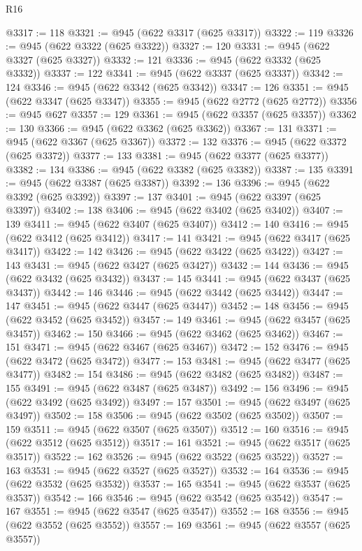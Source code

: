 \begin{lexlean}{R16}
\begin{coremodule}
@3317 := 118
@3321 := @945 (@622 @3317 (@625 @3317))
@3322 := 119
@3326 := @945 (@622 @3322 (@625 @3322))
@3327 := 120
@3331 := @945 (@622 @3327 (@625 @3327))
@3332 := 121
@3336 := @945 (@622 @3332 (@625 @3332))
@3337 := 122
@3341 := @945 (@622 @3337 (@625 @3337))
@3342 := 124
@3346 := @945 (@622 @3342 (@625 @3342))
@3347 := 126
@3351 := @945 (@622 @3347 (@625 @3347))
@3355 := @945 (@622 @2772 (@625 @2772))
@3356 := @945 @627
@3357 := 129
@3361 := @945 (@622 @3357 (@625 @3357))
@3362 := 130
@3366 := @945 (@622 @3362 (@625 @3362))
@3367 := 131
@3371 := @945 (@622 @3367 (@625 @3367))
@3372 := 132
@3376 := @945 (@622 @3372 (@625 @3372))
@3377 := 133
@3381 := @945 (@622 @3377 (@625 @3377))
@3382 := 134
@3386 := @945 (@622 @3382 (@625 @3382))
@3387 := 135
@3391 := @945 (@622 @3387 (@625 @3387))
@3392 := 136
@3396 := @945 (@622 @3392 (@625 @3392))
@3397 := 137
@3401 := @945 (@622 @3397 (@625 @3397))
@3402 := 138
@3406 := @945 (@622 @3402 (@625 @3402))
@3407 := 139
@3411 := @945 (@622 @3407 (@625 @3407))
@3412 := 140
@3416 := @945 (@622 @3412 (@625 @3412))
@3417 := 141
@3421 := @945 (@622 @3417 (@625 @3417))
@3422 := 142
@3426 := @945 (@622 @3422 (@625 @3422))
@3427 := 143
@3431 := @945 (@622 @3427 (@625 @3427))
@3432 := 144
@3436 := @945 (@622 @3432 (@625 @3432))
@3437 := 145
@3441 := @945 (@622 @3437 (@625 @3437))
@3442 := 146
@3446 := @945 (@622 @3442 (@625 @3442))
@3447 := 147
@3451 := @945 (@622 @3447 (@625 @3447))
@3452 := 148
@3456 := @945 (@622 @3452 (@625 @3452))
@3457 := 149
@3461 := @945 (@622 @3457 (@625 @3457))
@3462 := 150
@3466 := @945 (@622 @3462 (@625 @3462))
@3467 := 151
@3471 := @945 (@622 @3467 (@625 @3467))
@3472 := 152
@3476 := @945 (@622 @3472 (@625 @3472))
@3477 := 153
@3481 := @945 (@622 @3477 (@625 @3477))
@3482 := 154
@3486 := @945 (@622 @3482 (@625 @3482))
@3487 := 155
@3491 := @945 (@622 @3487 (@625 @3487))
@3492 := 156
@3496 := @945 (@622 @3492 (@625 @3492))
@3497 := 157
@3501 := @945 (@622 @3497 (@625 @3497))
@3502 := 158
@3506 := @945 (@622 @3502 (@625 @3502))
@3507 := 159
@3511 := @945 (@622 @3507 (@625 @3507))
@3512 := 160
@3516 := @945 (@622 @3512 (@625 @3512))
@3517 := 161
@3521 := @945 (@622 @3517 (@625 @3517))
@3522 := 162
@3526 := @945 (@622 @3522 (@625 @3522))
@3527 := 163
@3531 := @945 (@622 @3527 (@625 @3527))
@3532 := 164
@3536 := @945 (@622 @3532 (@625 @3532))
@3537 := 165
@3541 := @945 (@622 @3537 (@625 @3537))
@3542 := 166
@3546 := @945 (@622 @3542 (@625 @3542))
@3547 := 167
@3551 := @945 (@622 @3547 (@625 @3547))
@3552 := 168
@3556 := @945 (@622 @3552 (@625 @3552))
@3557 := 169
@3561 := @945 (@622 @3557 (@625 @3557))

\end{coremodule}
\end{lexlean}

